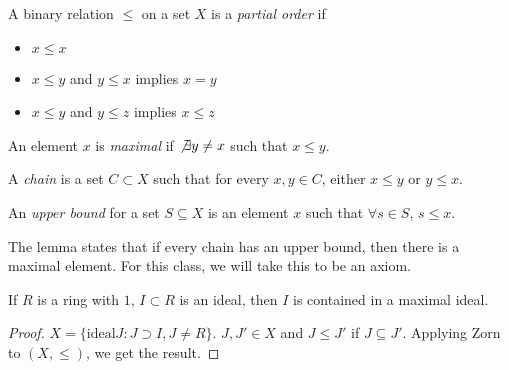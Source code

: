 \documentclass[a4paper,twoside,master.tex]{subfiles}
\begin{document}
\begin{lemma}
    \begin{definition}
        A binary relation $ \leq $ on a set $ X $ is a \textit{partial order} if
        \begin{itemize}
            \item $ x \leq x  $ 
            \item $ x \leq y  $ and $ y \leq x  $ implies $ x = y $ 
            \item $ x \leq y  $ and $ y \leq z   $ implies $ x \leq z  $
        \end{itemize}
        An element $ x $ is \textit{maximal} if $ \not\exists y \neq x  $ such that $ x \leq y  $.
    \end{definition}
    \begin{definition}
        A \textit{chain} is a set $ C \subset X $ such that for every $ x,y\in C $, either $ x \leq y $ or $ y \leq x  $.
    \end{definition}
    \begin{definition}
        An \textit{upper bound} for a set $ S \subseteq X  $ is an element $ x $ such that $ \forall s\in S  $, $ s \leq x  $.
    \end{definition}
    The lemma states that if every chain has an upper bound, then there is a maximal element. For this class, we will take this to be an axiom.
\end{lemma}

\begin{claim}
    If $ R $ is a ring with $ 1 $, $ I \subset R $ is an ideal, then $ I $ is contained in a maximal ideal.
\end{claim}
\begin{proof}
    $ X = \{\text{ideal} J \colon J\supset I, J \neq R \} $. $ J,J'\in X $ and $ J \leq J'  $ if $ J \subseteq J' $. Applying Zorn to $ (X, \leq ) $, we get the result.
\end{proof}
\end{document}

